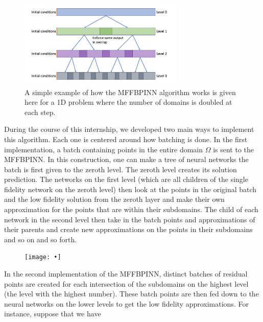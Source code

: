 \documentclass[12pt]{article}
\begin{document}
\begin{figure}[H] \label{fig:dd}
\centering
\includegraphics[width=0.7\textwidth]{imgs/domain_decomp.png}
\caption{A simple example of how the MFFBPINN algorithm works is given here for a 1D problem where the number of domains is doubled at each step.}
\end{figure}

During the course of this internship, we developed two main ways to implement this algorithm. Each one is centered around how batching is done. In the first implementation, a batch containing points in the entire domain $\Omega$ is sent to the MFFBPINN. In this construction, one can make a tree of neural networks the batch is first given to the zeroth level. The zeroth level creates its solution prediction. The networks on the first level (which are all children of the single fidelity network on the zeroth level) then look at the points in the original batch and the low fidelity solution from the zeroth layer and make their own approximation for the points that are within their subdomains. The child of each network in the second level then take in the batch points and approximations of their parents and create new approximations on the points in their subdomains and so on and so forth. 

\begin{figure}
\centering
\texttt{[image: •]}
\end{figure}

In the second implementation of the MFFBPINN, distinct batches of residual points are created for each intersection of the subdomains on the highest level (the level with the highest number). These batch points are then fed down to the neural networks on the lower levels to get the low fidelity approximations. For instance, suppose that we have 

\end{document}
